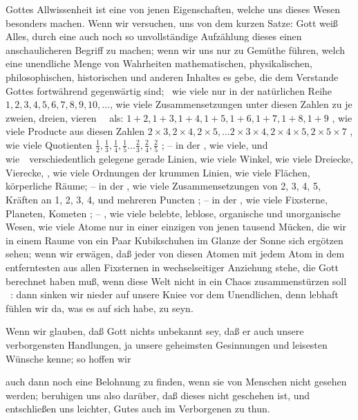 \begin{aufza}
\item Gottes Allwissenheit ist eine von jenen Eigenschaften, welche uns dieses Wesen besonders  machen. Wenn wir versuchen, uns von dem kurzen Satze: Gott weiß Alles, durch eine auch noch so unvollständige Aufzählung dieses  einen anschaulicheren Begriff zu machen; wenn wir uns nur zu Gemüthe führen, welch eine unendliche Menge von Wahrheiten mathematischen, physikalischen, philosophischen, historischen und anderen Inhaltes es gebe, die dem Verstande Gottes fortwährend gegenwärtig sind; \zB\ wie viele  nur in der natürlichen Reihe $1, 2, 3, 4, 5, 6, 7, 8, 9, 10, \ldots$, wie viele Zusammensetzungen unter diesen Zahlen zu je zweien, dreien, vieren \usw\ \auslass\ als: $1 + 2, 1 + 3, 1 + 4, 1 + 5, 1 + 6, 1 + 7, 1 + 8, 1 + 9$ \usw \auslass , wie viele Producte aus diesen Zahlen $2 \times 3, 2 \times 4, 2 \times 5, \ldots 2 \times 3 \times 4, 2 \times 4 \times 5, 2 \times 5 \times 7$  \auslass , wie viele Quotienten $\frac{1}{2}, \frac{1}{3}, \frac{1}{4}, \frac{1}{5} \ldots \frac{2}{3}, \frac{2}{4}, \frac{2}{5}$ \auslass \usw ; -- in der , wie viele, und wie~\ verschiedentlich gelegene gerade Linien, wie viele Winkel, wie viele Dreiecke, Vierecke, \usw , wie viele Ordnungen der krummen Linien, wie viele Flächen, körperliche Räume; -- in der , wie viele Zusammensetzungen von 2, 3, 4, 5, Kräften an 1, 2, 3, 4, und mehreren Puncten \usw \auslass ; -- in der , wie viele Fixsterne, Planeten, Kometen \usw \auslass ; -- , wie viele belebte, leblose, organische und unorganische Wesen, wie viele Atome nur in einer einzigen von jenen tausend Mücken, die wir in einem Raume von ein Paar Kubikschuhen im Glanze der Sonne sich ergötzen sehen; wenn wir erwägen, daß jeder von diesen Atomen mit jedem Atom in dem entferntesten aus allen Fixsternen in wechselseitiger Anziehung stehe, die Gott berechnet haben muß, wenn diese Welt nicht in ein Chaos zusammenstürzen soll \usw\ \usw : dann sinken wir nieder auf unsere Kniee vor dem Unendlichen, denn lebhaft fühlen wir da, was es auf sich habe,  zu seyn.
\item Wenn wir glauben, daß Gott nichts unbekannt sey, daß er auch unsere verborgensten Handlungen, ja unsere geheimsten Gesinnungen und leisesten Wünsche kenne; so hoffen wir
\begin{aufzb}
\item {} auch dann noch eine Belohnung zu finden, wenn sie von Menschen nicht gesehen werden; beruhigen uns also darüber, daß dieses nicht geschehen ist, und entschließen uns leichter, Gutes auch im Verborgenen zu thun.

\end{aufzb}
\end{aufza}
